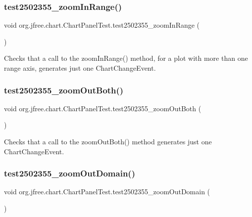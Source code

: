 \subsubsection{\texorpdfstring{test2502355\+\_\+zoom\+In\+Range()}{test2502355\_zoomInRange()}}
{\footnotesize\ttfamily void org.\+jfree.\+chart.\+Chart\+Panel\+Test.\+test2502355\+\_\+zoom\+In\+Range (\begin{DoxyParamCaption}{ }\end{DoxyParamCaption})}

Checks that a call to the zoom\+In\+Range() method, for a plot with more than one range axis, generates just one Chart\+Change\+Event. \mbox{\label{classorg_1_1jfree_1_1chart_1_1_chart_panel_test_af18b31659da9ed00a490c8d713926b9d}} 
\subsubsection{\texorpdfstring{test2502355\+\_\+zoom\+Out\+Both()}{test2502355\_zoomOutBoth()}}
{\footnotesize\ttfamily void org.\+jfree.\+chart.\+Chart\+Panel\+Test.\+test2502355\+\_\+zoom\+Out\+Both (\begin{DoxyParamCaption}{ }\end{DoxyParamCaption})}

Checks that a call to the zoom\+Out\+Both() method generates just one Chart\+Change\+Event. \mbox{\label{classorg_1_1jfree_1_1chart_1_1_chart_panel_test_ad7829bcfaf0b4824d649e9e4a0e29578}} 
\subsubsection{\texorpdfstring{test2502355\+\_\+zoom\+Out\+Domain()}{test2502355\_zoomOutDomain()}}
{\footnotesize\ttfamily void org.\+jfree.\+chart.\+Chart\+Panel\+Test.\+test2502355\+\_\+zoom\+Out\+Domain (\begin{DoxyParamCaption}{ }\end{DoxyParamCaption})}

